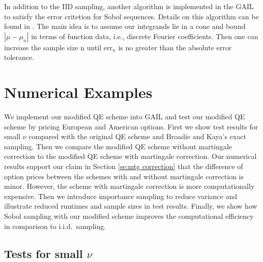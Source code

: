 \documentclass{ws-ijfe}
\begin{document}
In addition to the IID sampling, another algorithm is implemented in the GAIL to satisfy the error critetion for Sobol sequences. Details on this algorithm can be found in \cite{HickernellTonyandDa}. The main idea is to assume our integrands lie in a cone and bound $|\mu-\mu_n|$ in terms of function data, i.e., discrete Fourier coefficients. Then one can increase the sample size n until $\text{err}_n$ is no greater than the absolute error tolerance.


\section{Numerical Examples}

We implement our modified QE scheme into GAIL and test our modified QE scheme by pricing European and American options. First we show test results for small $\nu$ compared with the original QE scheme and Broadie and Kaya's exact sampling. Then we compare the modified QE scheme without martingale correction to the modified QE scheme with martingale correction. Our numerical results support our claim in Section \ref{se:mtg correction} that the difference of option prices between the schemes with and without martingale correction is minor. However, the scheme with martingale correction is more computationally expensive. Then we introduce importance sampling to reduce variance and illustrate reduced runtimes and sample sizes in test results. Finally, we show how Sobol sampling with our modified scheme improves the computational efficiency in comparison to i.i.d.\ sampling.

\subsection{Tests for small $\nu$}
\end{document}
